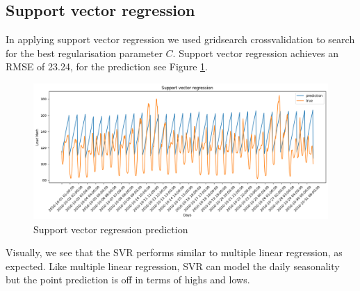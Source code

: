 \subsection{Support vector regression}
In applying support vector regression we used gridsearch crossvalidation to search for the best regularisation parameter $C$. Support vector regression achieves an RMSE of 23.24, for the prediction see Figure \ref{fig:svr_price}.
\begin{figure}[!h]
    \includegraphics[width=\textwidth]{images/svr_price.png}
    \caption{Support vector regression prediction}
    \label{fig:svr_price}
\end{figure}
Visually, we see that the SVR performs similar to multiple linear regression, as expected. Like multiple linear regression, SVR can model the daily seasonality but the point prediction is off in terms of highs and lows.


